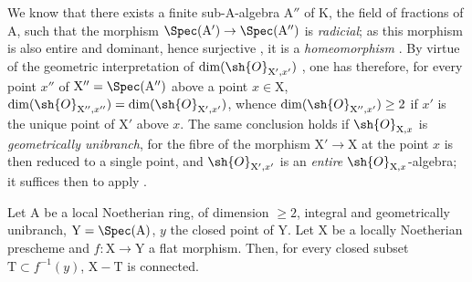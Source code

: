 \begin{remark}[18.9.7.6]
\label{IV.18.9.7.6}
We know  that there exists a finite sub-A-algebra $\mathrm{A}''$ of K, the field of fractions of A, such that the morphism $\Spec(\mathrm{A}')\to\Spec(\mathrm{A}'')$ is \emph{radicial};
as this morphism is also entire and dominant, hence surjective , it is a \emph{homeomorphism} .
By virtue of the geometric interpretation of $\dim(\sh{O}_{\mathrm{X}',x'})$ , one has therefore, for every point $x''$ of $\mathrm{X}''=\Spec(\mathrm{A}'')$ above a point $x\in\mathrm{X}$, $\dim(\sh{O}_{\mathrm{X}'',x''})=\dim(\sh{O}_{\mathrm{X}',x'})$, whence $\dim(\sh{O}_{\mathrm{X}'',x'})\geq 2$ if $x'$ is the unique point of $\mathrm{X}'$ above $x$.
The same conclusion holds if $\sh{O}_{\mathrm{X},x}$ is \emph{geometrically unibranch}, for the fibre of the morphism $\mathrm{X}'\to\mathrm{X}$ at the point $x$ is then reduced to a single point, and $\sh{O}_{\mathrm{X}',x'}$ is an \emph{entire} $\sh{O}_{\mathrm{X},x}$-algebra;
it suffices then to apply .
\end{remark}

\begin{lemma}[18.9.7.7]
\label{IV.18.9.7.7}
Let $\mathrm{A}$ be a local Noetherian ring, of dimension $\geq 2$, integral and geometrically unibranch, $\mathrm{Y}=\Spec(\mathrm{A})$, $y$ the closed point of Y.
Let $\mathrm{X}$ be a locally Noetherian prescheme and $f:\mathrm{X}\to\mathrm{Y}$ a flat morphism.
Then, for every closed subset $\mathrm{T}\subset f^{-1}(y)$, $\mathrm{X}-\mathrm{T}$ is connected.
\end{lemma}

